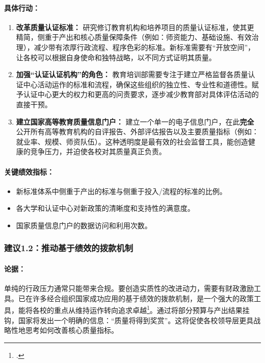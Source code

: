 \paragraph{具体行动：}
\begin{enumerate}
    \item \textbf{改革质量认证标准：} 研究修订教育机构和培养项目的质量认证标准，使其更精简，侧重于产出和核心质量保障条件（例如：师资能力、基础设施、有效治理），减少带有浓厚行政流程、程序色彩的标准。新标准需要有“开放空间”，让各校可以根据自身使命和独特战略，以不同方式证明其质量。
    
    \item \textbf{加强“认证认证机构”的角色：} 教育培训部需要专注于建立严格监督各质量认证中心活动运作的标准和流程，确保这些组织的独立性、专业性和道德性。赋予认证中心更大的权力和更高的问责要求，逐步减少教育部对具体评估活动的直接干预。
    
    \item \textbf{建立国家高等教育质量信息门户：} 建立一个单一的电子信息门户，在此\textbf{完全}公开所有高等教育机构的自评报告、外部评估报告以及主要质量指标（例如：就业率、规模、师资队伍）。这种透明度是最有效的社会监督工具，能创造健康的竞争压力，并迫使各校对其质量真正负责。
\end{enumerate}

\paragraph{关键绩效指标：}
\begin{itemize}
    \item 新标准体系中侧重于产出的标准与侧重于投入/流程的标准的比例。
    \item 各大学和认证中心对新政策的清晰度和支持性的满意度。
    \item 国家质量信息门户的数据访问和利用次数。
\end{itemize}

\subsubsection{建议1.2：推动基于绩效的拨款机制}

\paragraph{论据：}
单纯的行政压力通常只能带来合规。要创造实质性的改进动力，需要有财政激励工具。已在许多经合组织国家成功应用的基于绩效的拨款机制，是一个强大的政策工具，能将各校的重点从维持运作转向追求卓越\footcite{oecd_pbf_2021}。通过将部分预算与产出结果挂钩，国家将发出一个明确的信息：“质量将得到奖赏”。这将促使各校领导层更具战略性地思考如何改善核心质量指标。

